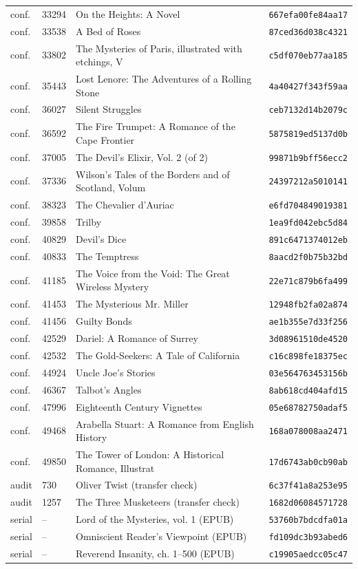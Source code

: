 \documentclass[11pt]{article}
\begin{document}
{\begin{longtable}{p{0.9cm}p{1.0cm}p{8.4cm}p{3.2cm}}
conf. & 33294 & On the Heights: A Novel & \texttt{667efa00fe84aa17} \\
conf. & 33538 & A Bed of Roses & \texttt{87ced36d038c4321} \\
conf. & 33802 & The Mysteries of Paris, illustrated with etchings, V & \texttt{c5df070eb77aa185} \\
conf. & 35443 & Lost Lenore: The Adventures of a Rolling Stone & \texttt{4a40427f343f59aa} \\
conf. & 36027 & Silent Struggles & \texttt{ceb7132d14b2079c} \\
conf. & 36592 & The Fire Trumpet: A Romance of the Cape Frontier & \texttt{5875819ed5137d0b} \\
conf. & 37005 & The Devil's Elixir, Vol. 2 (of 2) & \texttt{99871b9bff56ecc2} \\
conf. & 37336 & Wilson's Tales of the Borders and of Scotland, Volum & \texttt{24397212a5010141} \\
conf. & 38323 & The Chevalier d'Auriac & \texttt{e6fd704849019381} \\
conf. & 39858 & Trilby & \texttt{1ea9fd042ebc5d84} \\
conf. & 40829 & Devil's Dice & \texttt{891c6471374012eb} \\
conf. & 40833 & The Temptress & \texttt{8aacd2f0b75b32bd} \\
conf. & 41185 & The Voice from the Void: The Great Wireless Mystery & \texttt{22e71c879b6fa499} \\
conf. & 41453 & The Mysterious Mr. Miller & \texttt{12948fb2fa02a874} \\
conf. & 41456 & Guilty Bonds & \texttt{ae1b355e7d33f256} \\
conf. & 42529 & Dariel: A Romance of Surrey & \texttt{3d08961510de4520} \\
conf. & 42532 & The Gold-Seekers: A Tale of California & \texttt{c16c898fe18375ec} \\
conf. & 44924 & Uncle Joe's Stories & \texttt{03e564763453156b} \\
conf. & 46367 & Talbot's Angles & \texttt{8ab618cd404afd15} \\
conf. & 47996 & Eighteenth Century Vignettes & \texttt{05e68782750adaf5} \\
conf. & 49468 & Arabella Stuart: A Romance from English History & \texttt{168a078008aa2471} \\
conf. & 49850 & The Tower of London: A Historical Romance, Illustrat & \texttt{17d6743ab0cb90ab} \\
audit & 730 & Oliver Twist (transfer check) & \texttt{6c37f41a8a253e95} \\
audit & 1257 & The Three Musketeers (transfer check) & \texttt{1682d06084571728} \\
serial & -- & Lord of the Mysteries, vol. 1 (EPUB) & \texttt{53760b7bdcdfa01a} \\
serial & -- & Omniscient Reader's Viewpoint (EPUB) & \texttt{fd109dc3b93abed6} \\
serial & -- & Reverend Insanity, ch. 1--500 (EPUB) & \texttt{c19905aedcc05c47} \\
\bottomrule\end{longtable}}
\end{document}
